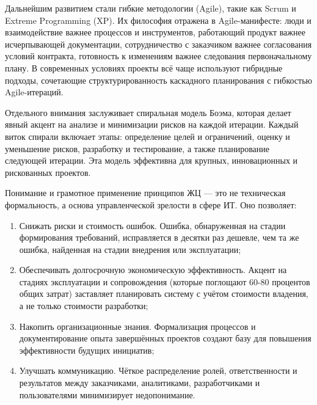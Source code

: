 \documentclass{SibFU-docs}
\begin{document}
Дальнейшим развитием стали гибкие методологии (Agile), такие как Scrum и Extreme Programming (XP). Их философия отражена в Agile-манифесте: люди и взаимодействие важнее процессов и инструментов, работающий продукт важнее исчерпывающей документации, сотрудничество с заказчиком важнее согласования условий контракта, готовность к изменениям важнее следования первоначальному плану. В современных условиях проекты всё чаще используют гибридные подходы, сочетающие структурированность каскадного планирования с гибкостью Agile-итераций. \cite{gost3460190, sommerville2016se, schwaber2020scrum, pressman2014se}


Отдельного внимания заслуживает спиральная модель Боэма, которая делает явный акцент на анализе и минимизации рисков на каждой итерации. Каждый виток спирали включает этапы: определение целей и ограничений, оценку и уменьшение рисков, разработку и тестирование, а также планирование следующей итерации. Эта модель эффективна для крупных, инновационных и рискованных проектов.


Понимание и грамотное применение принципов ЖЦ — это не техническая формальность, а основа управленческой зрелости в сфере ИТ. Оно позволяет:

\begin{enumerate}

\item Снижать риски и стоимость ошибок. Ошибка, обнаруженная на стадии формирования требований, исправляется в десятки раз дешевле, чем та же ошибка, найденная на стадии внедрения или эксплуатации;
\item Обеспечивать долгосрочную экономическую эффективность. Акцент на стадиях эксплуатации и сопровождения (которые поглощают 60-80 процентов общих затрат) заставляет планировать систему с учётом стоимости владения, а не только стоимости разработки;
\item Накопить организационные знания. Формализация процессов и документирование опыта завершённых проектов создают базу для повышения эффективности будущих инициатив;
\item Улучшать коммуникацию. Чёткое распределение ролей, ответственности и результатов между заказчиками, аналитиками, разработчиками и пользователями минимизирует недопонимание.
\end{enumerate}
\end{document}

